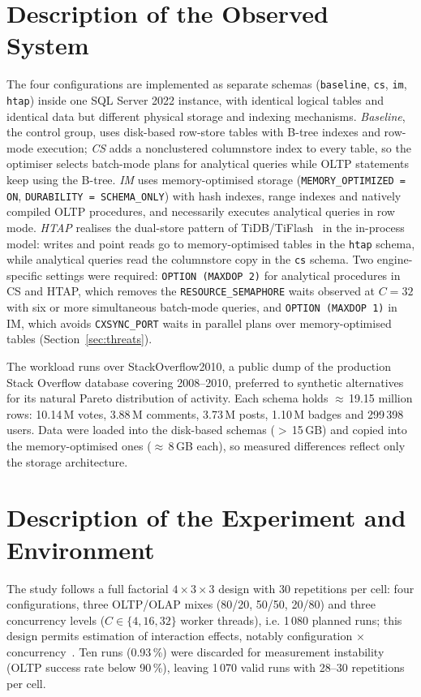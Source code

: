 \documentclass[10pt,conference,a4paper]{IEEEtran}
\begin{document}
\section{Description of the Observed System}
The four configurations are implemented as separate schemas
(\texttt{baseline}, \texttt{cs}, \texttt{im}, \texttt{htap}) inside one SQL
Server 2022 instance, with identical logical tables and identical data but
different physical storage and indexing mechanisms. \emph{Baseline}, the
control group, uses disk-based row-store tables with B-tree indexes and
row-mode execution; \emph{CS} adds a nonclustered columnstore index to every
table, so the optimiser selects batch-mode plans for analytical queries while
OLTP statements keep using the B-tree. \emph{IM} uses memory-optimised
storage (\texttt{MEMORY\_OPTIMIZED = ON},
\texttt{DURABILITY = SCHEMA\_ONLY}) with hash indexes, range indexes and
natively compiled OLTP procedures, and necessarily executes analytical
queries in row mode. \emph{HTAP} realises the dual-store pattern of
TiDB/TiFlash~\cite{huang2020} in the in-process model: writes and point
reads go to memory-optimised tables in the \texttt{htap} schema, while
analytical queries read the columnstore copy in the \texttt{cs} schema. Two
engine-specific settings were required: \texttt{OPTION (MAXDOP 2)} for
analytical procedures in CS and HTAP, which removes the
\texttt{RESOURCE\_SEMAPHORE} waits observed at $C = 32$ with six or more
simultaneous batch-mode queries, and \texttt{OPTION (MAXDOP 1)} in IM, which
avoids \texttt{CXSYNC\_PORT} waits in parallel plans over memory-optimised
tables (Section~\ref{sec:threats}).

The workload runs over StackOverflow2010, a public dump of the production
Stack Overflow database covering 2008--2010, preferred to synthetic
alternatives for its natural Pareto distribution of activity. Each schema holds
$\approx$\,19.15 million rows: 10.14\,M votes, 3.88\,M comments,
3.73\,M posts, 1.10\,M badges and 299\,398 users. Data were loaded
into the disk-based schemas ($>$\,15\,GB) and copied into the
memory-optimised ones ($\approx$\,8\,GB each), so measured differences reflect
only the storage architecture.

\section{Description of the Experiment and Environment}
The study follows a full factorial $4\times3\times3$ design with 30
repetitions per cell: four configurations, three OLTP/OLAP mixes (80/20,
50/50, 20/80) and three concurrency levels ($C \in \{4, 16, 32\}$ worker
threads), i.e. 1\,080 planned runs; this design permits estimation of
interaction effects, notably configuration $\times$
concurrency~\cite{zhang2024hybench}. Ten runs (0.93\,\%) were discarded for
measurement instability (OLTP success rate below 90\,\%), leaving 1\,070
valid runs with 28--30 repetitions per cell.
\end{document}
